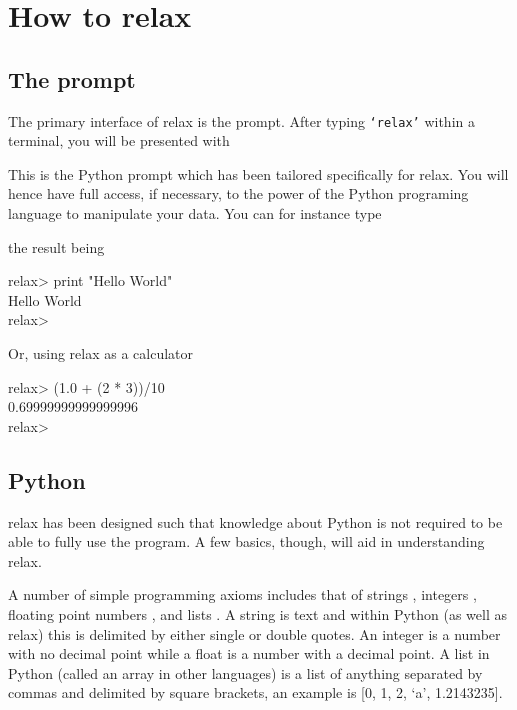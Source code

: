 
\chapter{How to relax}



\section{The prompt}

The primary interface of relax is the prompt.  After typing \texttt{`relax'} within a terminal, you will be presented with


This is the Python prompt which has been tailored specifically for relax.  You will hence have full access, if necessary, to the power of the Python  programing language to manipulate your data.  You can for instance type


the result being

\begin{exampleenv}
relax> print "Hello World" \\
Hello World \\
relax> \\
\end{exampleenv}

Or, using relax as a calculator

\begin{exampleenv}
relax> (1.0 + (2 * 3))/10 \\
0.69999999999999996 \\
relax> \\
\end{exampleenv}




\section{Python}

relax has been designed such that knowledge about Python  is not required to be able to fully use the program.  A few basics, though, will aid in understanding relax.

A number of simple programming axioms includes that of strings , integers , floating point numbers , and lists .  A string is text and within Python  (as well as relax) this is delimited by either single or double quotes.  An integer is a number with no decimal point while a float is a number with a decimal point.  A list in Python  (called an array in other languages) is a list of anything separated by commas and delimited by square brackets, an example is [0, 1, 2, `a', 1.2143235].

